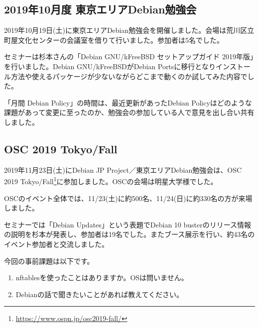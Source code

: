 \documentclass[mingoth,a4paper]{jsarticle}
\begin{document}

\subsection{2019年10月度 東京エリアDebian勉強会}

2019年10月19日(土)に東京エリアDebian勉強会を開催しました。会場は荒川区立町屋文化センターの会議室を借りて行いました。参加者は5名でした。

セミナーは杉本さんの「Debian GNU/kFreeBSD セットアップガイド 2019年版」を行いました。Debian GNU/kFreeBSDがDebian Portsに移行となりインストール方法や使えるパッケージが少ないながらどこまで動くのか試してみた内容でした。

「月間 Debian Policy」の時間は、最近更新があったDebian Policyはどのような課題があって変更に至ったのか、勉強会の参加している人で意見を出し合い共有しました。


\subsection{OSC 2019 Tokyo/Fall}

2019年11月23日(土)にDebian JP Project／東京エリアDebian勉強会は、OSC 2019 Tokyo/Fall\footnote{\url{https://www.ospn.jp/osc2019-fall/}}に参加しました。OSCの会場は明星大学様でした。

OSCのイベント全体では、11/23(土)に約500名、11/24(日)に約330名の方が来場しました。

セミナーでは「Debian Updates」という表題でDebian 10 busterのリリース情報の説明を杉本が発表し、参加者は19名でした。またブース展示を行い、約43名のイベント参加者と交流しました。




今回の事前課題は以下です。

\begin{enumerate}
\item nftablesを使ったことはありますか。OSは問いません。
\item Debianの話で聞きたいことがあれば教えてください。
\end{enumerate}


\begin{multicols}{2}
{\small

}
\end{multicols}
\end{document}
